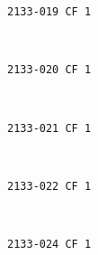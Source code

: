 \documentclass[11pt]{article}
\begin{document}
    \begin{Verbatim}[commandchars=\\\{\}]
2133-019 CF 1

    \end{Verbatim}

    \begin{center}
    \end{center}
    { \hspace*{\fill} \\}
    
    \begin{Verbatim}[commandchars=\\\{\}]
2133-020 CF 1

    \end{Verbatim}

    \begin{center}
    \end{center}
    { \hspace*{\fill} \\}
    
    \begin{Verbatim}[commandchars=\\\{\}]
2133-021 CF 1

    \end{Verbatim}

    \begin{center}
    \end{center}
    { \hspace*{\fill} \\}
    
    \begin{Verbatim}[commandchars=\\\{\}]
2133-022 CF 1

    \end{Verbatim}

    \begin{center}
    \end{center}
    { \hspace*{\fill} \\}
    
    \begin{Verbatim}[commandchars=\\\{\}]
2133-024 CF 1

    \end{Verbatim}
\end{document}
